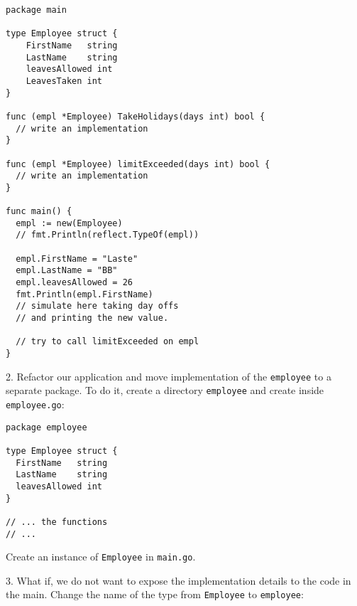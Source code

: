 \documentclass[11pt, letterpaper]{article}
\begin{document}
\begin{verbatim}
package main

type Employee struct {
    FirstName   string
    LastName    string
    leavesAllowed int
    LeavesTaken int
}

func (empl *Employee) TakeHolidays(days int) bool {
  // write an implementation
}

func (empl *Employee) limitExceeded(days int) bool {
  // write an implementation
}

func main() {
  empl := new(Employee)
  // fmt.Println(reflect.TypeOf(empl))

  empl.FirstName = "Laste"
  empl.LastName = "BB"
  empl.leavesAllowed = 26
  fmt.Println(empl.FirstName)
  // simulate here taking day offs
  // and printing the new value.

  // try to call limitExceeded on empl
}
\end{verbatim}







\bigskip

2. Refactor our application and move implementation of the \verb|employee| to a separate package. To do it, create a directory \verb|employee| and create inside \verb|employee.go|:

\begin{verbatim}
package employee

type Employee struct {
  FirstName   string
  LastName    string
  leavesAllowed int
}

// ... the functions
// ...

\end{verbatim}

Create an instance of \verb|Employee| in \verb|main.go|.

\bigskip

3. What if, we do not want to expose the implementation details to the code in the main. Change the name of the type from \verb|Employee| to \verb|employee|:
\end{document}
